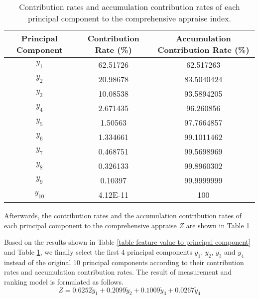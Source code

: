 \documentclass{apmcmthesis}
\begin{document}
\begin{table}[h]
\centering
\footnotesize
\caption{Contribution rates and accumulation contribution rates of each principal component to the comprehensive appraise index.}
\begin{tabular}{|c|c|c|}
\hline
\textbf{Principal Component}&\textbf{Contribution Rate (\%)}& \textbf{Accumulation Contribution Rate (\%)}\\
\hline
\textbf{$y_1$} & 62.51726 & 62.517263  \\
\hline
\textbf{$y_2$} & 20.98678 & 83.5040424  \\
\hline
\textbf{$y_3$} & 10.08538 & 93.5894205  \\
\hline
\textbf{$y_4$} & 2.671435 & 96.260856  \\
\hline
\textbf{$y_5$} & 1.50563 & 97.7664857  \\
\hline
\textbf{$y_6$} & 1.334661 & 99.1011462  \\
\hline
\textbf{$y_7$} & 0.468751 & 99.5698969  \\
\hline
\textbf{$y_8$} & 0.326133 & 99.8960302  \\
\hline
\textbf{$y_9$} & 0.10397 & 99.9999999  \\
\hline
\textbf{$y_{10}$} & 4.12E-11 & 100  \\
\hline
\end{tabular}\label{table contribution of pringcipal components}
\end{table}

Afterwards, the contribution rates and the accumulation contribution rates of each principal component to the comprehensive appraise $Z$ are shown in Table \ref{table contribution of pringcipal components} 

Based on the results shown in Table \ref{table feature value to principal component} and Table \ref{table contribution of pringcipal components}, we finally select the first 4 principal components $y_1$, $y_2$, $y_3$ and $y_4$ instead of the original 10 principal components according to their contribution rates and accumulation contribution rates. The result of measurement and ranking model is formulated as follows.
\begin{equation}
Z=0.6252 {\tilde{y}}_{1}+0.2099 {\tilde{y}}_{2}+0.1009 {\tilde{y}}_{3}+0.0267 {\tilde{y}}_{4}
\end{equation}
\end{document}
